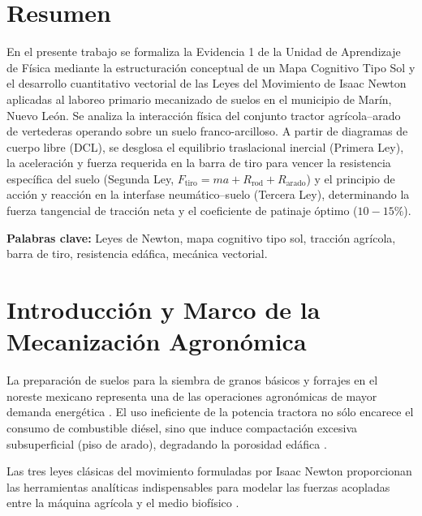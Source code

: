 \documentclass[12pt,spanish,letterpaper,oneside]{article}
\begin{document}
\hypersetup{pageanchor=false}
\begingroup
\fontsize{14}{17}\selectfont
\renewcommand{\Huge}{\fontsize{14}{17}\selectfont\bfseries}
\renewcommand{\large}{\fontsize{14}{17}\selectfont}
\templatePortrait
\clearpage
\endgroup
\hypersetup{pageanchor=true}
\templatePagecfg
\singlespacing
\setlength{\tabcolsep}{8pt}
\renewcommand{\arraystretch}{1.18}

\section*{Resumen}
En el presente trabajo se formaliza la Evidencia 1 de la Unidad de Aprendizaje de Física mediante la estructuración conceptual de un Mapa Cognitivo Tipo Sol y el desarrollo cuantitativo vectorial de las Leyes del Movimiento de Isaac Newton aplicadas al laboreo primario mecanizado de suelos en el municipio de Marín, Nuevo León. Se analiza la interacción física del conjunto tractor agrícola--arado de vertederas operando sobre un suelo franco-arcilloso. A partir de diagramas de cuerpo libre (DCL), se desglosa el equilibrio traslacional inercial (Primera Ley), la aceleración y fuerza requerida en la barra de tiro para vencer la resistencia específica del suelo (Segunda Ley, $F_{\text{tiro}} = m a + R_{\text{rod}} + R_{\text{arado}}$) y el principio de acción y reacción en la interfase neumático--suelo (Tercera Ley), determinando la fuerza tangencial de tracción neta y el coeficiente de patinaje óptimo ($10-15\%$).

\vspace{0.4cm}
\noindent\textbf{Palabras clave:} Leyes de Newton, mapa cognitivo tipo sol, tracción agrícola, barra de tiro, resistencia edáfica, mecánica vectorial.

\section{Introducción y Marco de la Mecanización Agronómica}
La preparación de suelos para la siembra de granos básicos y forrajes en el noreste mexicano representa una de las operaciones agronómicas de mayor demanda energética \parencite{serway2018}. El uso ineficiente de la potencia tractora no sólo encarece el consumo de combustible diésel, sino que induce compactación excesiva subsuperficial (piso de arado), degradando la porosidad edáfica \parencite{giancoli2008}.

Las tres leyes clásicas del movimiento formuladas por Isaac Newton proporcionan las herramientas analíticas indispensables para modelar las fuerzas acopladas entre la máquina agrícola y el medio biofísico \parencite{tipler2010}.
\end{document}
